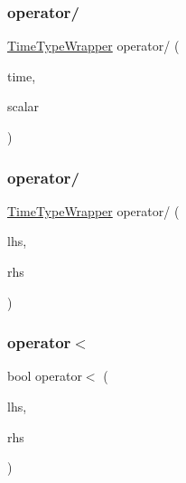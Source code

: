 \subsubsection{\texorpdfstring{operator/}{operator/}\hspace{0.1cm}{\footnotesize\ttfamily [2/3]}}
{\footnotesize\ttfamily \hyperlink{structvt_1_1_time_type_wrapper}{Time\+Type\+Wrapper} operator/ (\begin{DoxyParamCaption}\item[{const \hyperlink{structvt_1_1_time_type_wrapper}{Time\+Type\+Wrapper} \&}]{time,  }\item[{const double}]{scalar }\end{DoxyParamCaption})\hspace{0.3cm}{\ttfamily [friend]}}

\mbox{\label{structvt_1_1_time_type_wrapper_a6ae72117fbbbd813cb147f18196f9874}} 
\subsubsection{\texorpdfstring{operator/}{operator/}\hspace{0.1cm}{\footnotesize\ttfamily [3/3]}}
{\footnotesize\ttfamily \hyperlink{structvt_1_1_time_type_wrapper}{Time\+Type\+Wrapper} operator/ (\begin{DoxyParamCaption}\item[{const \hyperlink{structvt_1_1_time_type_wrapper}{Time\+Type\+Wrapper} \&}]{lhs,  }\item[{const \hyperlink{structvt_1_1_time_type_wrapper}{Time\+Type\+Wrapper} \&}]{rhs }\end{DoxyParamCaption})\hspace{0.3cm}{\ttfamily [friend]}}

\mbox{\label{structvt_1_1_time_type_wrapper_adbf090742dcb35298a559f6108e1f373}} 
\subsubsection{\texorpdfstring{operator$<$}{operator<}}
{\footnotesize\ttfamily bool operator$<$ (\begin{DoxyParamCaption}\item[{const \hyperlink{structvt_1_1_time_type_wrapper}{Time\+Type\+Wrapper} \&}]{lhs,  }\item[{const \hyperlink{structvt_1_1_time_type_wrapper}{Time\+Type\+Wrapper} \&}]{rhs }\end{DoxyParamCaption})\hspace{0.3cm}{\ttfamily [friend]}}

